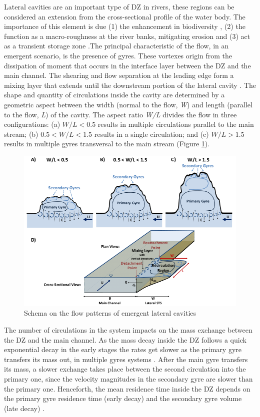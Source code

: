 Lateral cavities are an important type of DZ in rivers, these regions can be considered an extension from the cross-sectional profile of the water body. The importance of this element is due (1) the enhancement in biodiversity \cite{ribi2014,harvey2016}, (2) the function as a macro-roughness at the river banks, mitigating erosion \cite{juez2018} and (3) act as a transient storage zone \cite{jackson2013,drost2014,jackson2015}.The principal characteristic of the flow, in an emergent scenario, is the presence of gyres. These vortexes origin from the dissipation of moment that occurs in the interface layer between the DZ and the main channel. The shearing and flow separation at the leading edge form a mixing layer that extends until the downstream portion of the lateral cavity \cite{uijttewaal2005,jackson2013}. The shape and quantity of circulations inside the cavity are determined by a geometric aspect between the width (normal to the flow, \textit{W}) and length (parallel to the flow, \textit{L}) of the cavity. The aspect ratio \textit{W/L} divides the flow in three configurations: (a) $W/L<0.5$ results in multiple circulations parallel to the main stream; (b) $0.5<W/L<1.5$ results in a single circulation; and (c) $W/L>1.5$ results in multiple gyres transversal to the main stream \cite{weitbrecht2001,jackson2013,sukhodolov2014}(Figure \ref{fig:lCavitySchema}).

\begin{figure}[!ht]
\centering
\includegraphics[width=0.9\linewidth]{../images/introduction/lateralCavitySchema.png}
\caption{Schema on the flow patterns of emergent lateral cavities \cite{jackson2013}}
\label{fig:lCavitySchema}
\end{figure}

The number of circulations in the system impacts on the mass exchange between the DZ and the main channel. As the mass decay inside the DZ follows a quick exponential decay in the early stages the rates get slower as the primary gyre transfers its mass out, in multiple gyres systems \cite{jackson2012}. After the main gyre transfers its mass, a slower exchange takes place between the second circulation into the primary one, since the velocity magnitudes in the secondary gyre are slower than the primary one. Henceforth, the mean residence time inside the DZ depends on the primary gyre residence time (early decay) and the secondary gyre volume (late decay) \cite{jackson2013}.

